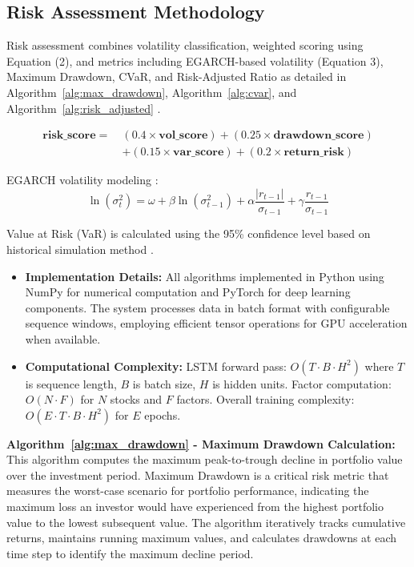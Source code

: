 \documentclass[3p,times,procedia]{elsarticle}
\begin{document}
\subsection{Risk Assessment Methodology}
\vspace{-2pt}
Risk assessment combines volatility classification, weighted scoring using Equation (2), and metrics including EGARCH-based volatility (Equation 3), Maximum Drawdown, CVaR, and Risk-Adjusted Ratio as detailed in Algorithm~\ref{alg:max_drawdown}, Algorithm~\ref{alg:cvar}, and Algorithm~\ref{alg:risk_adjusted} \cite{Jorion2001,Rockafellar2000}.

\begin{align}
\mathbf{risk\_score} =\ & (0.4 \times \mathbf{vol\_score}) + (0.25 \times \mathbf{drawdown\_score}) \nonumber \\
& + (0.15 \times \mathbf{var\_score}) + (0.2 \times \mathbf{return\_risk})
\end{align}

EGARCH volatility modeling \cite{Nelson1991}:
\begin{equation}
\ln(\sigma_t^2) = \omega + \beta \ln(\sigma_{t-1}^2) + \alpha \frac{|r_{t-1}|}{\sigma_{t-1}} + \gamma \frac{r_{t-1}}{\sigma_{t-1}}
\end{equation}

Value at Risk (VaR) is calculated using the 95\% confidence level based on historical simulation method \cite{Jorion2001}.

\begin{itemize}\setlength{\itemsep}{2pt}
\item \textbf{Implementation Details:} All algorithms implemented in Python using NumPy for numerical computation and PyTorch for deep learning components. The system processes data in batch format with configurable sequence windows, employing efficient tensor operations for GPU acceleration when available.

\item \textbf{Computational Complexity:} LSTM forward pass: $O(T \cdot B \cdot H^2)$ where $T$ is sequence length, $B$ is batch size, $H$ is hidden units. Factor computation: $O(N \cdot F)$ for $N$ stocks and $F$ factors. Overall training complexity: $O(E \cdot T \cdot B \cdot H^2)$ for $E$ epochs.
\end{itemize}

\textbf{Algorithm~\ref{alg:max_drawdown} - Maximum Drawdown Calculation:} This algorithm computes the maximum peak-to-trough decline in portfolio value over the investment period. Maximum Drawdown is a critical risk metric that measures the worst-case scenario for portfolio performance, indicating the maximum loss an investor would have experienced from the highest portfolio value to the lowest subsequent value. The algorithm iteratively tracks cumulative returns, maintains running maximum values, and calculates drawdowns at each time step to identify the maximum decline period.
\end{document}
